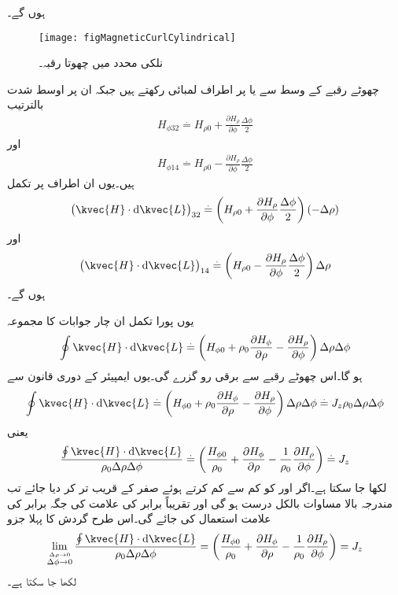 ہوں گے۔
\begin{figure}
\centering
\texttt{[image: figMagneticCurlCylindrical]}
\caption{نلکی محدد میں چھوتا رقبہ۔}
\label{شکل_مقناطیسی_نلکی_شدت_رقبہ}
\end{figure}

چھوٹے رقبے کے وسط سے   یا  پر  اطراف
  لمبائی رکھتے ہیں جبکہ ان پر اوسط شدت بالترتیب
\begin{align*}
H_{\phi 32}\overset{.}{=}H_{\rho 0}+\frac{\partial H_\rho}{\partial \phi}\frac{\Delta \phi}{2}
\end{align*}
اور
\begin{align*}
H_{\phi 14}\overset{.}{=}H_{\rho 0}-\frac{\partial H_\rho}{\partial \phi}\frac{\Delta \phi}{2}
\end{align*}
ہیں۔یوں ان اطراف پر تکمل
\begin{align*}
\left(\kvec{H} \cdot \dif \kvec{L}\right)_{32} \overset{.}{=}\left(H_{\rho 0}+\frac{\partial H_\rho}{\partial \phi}\frac{\Delta \phi}{2} \right)\left(-\Delta \rho \right)
\end{align*}
اور
\begin{align*}
\left(\kvec{H} \cdot \dif \kvec{L}\right)_{14} \overset{.}{=}\left(H_{\rho 0}-\frac{\partial H_\rho}{\partial \phi}\frac{\Delta \phi}{2} \right)\Delta \rho
\end{align*}
ہوں گے۔

یوں پورا تکمل ان چار جوابات کا مجموعہ
\begin{align}\label{مساوات_مقناطیسی_نلکی_پہلا_بند_تکمل}
\oint\kvec{H} \cdot \dif \kvec{L}\overset{.}{=}\left(H_{\phi 0} +\rho_0 \frac{\partial H_\phi}{\partial \rho}-\frac{\partial H_\rho}{\partial \phi}\right)\Delta \rho \Delta \phi
\end{align}
ہو گا۔اس چھوٹے رقبے سے  برقی رو گزرے گی۔یوں ایمپیئر کے دوری قانون سے
\begin{align*}
\oint \kvec{H} \cdot \dif \kvec{L}\overset{.}{=}\left(H_{\phi 0} +\rho_0 \frac{\partial H_\phi}{\partial \rho}-\frac{\partial H_\rho}{\partial \phi}\right)\Delta \rho \Delta \phi\overset{.}{=}J_z \rho_0 \Delta \rho \Delta \phi
\end{align*}
یعنی
\begin{align*}
\frac{\oint \kvec{H} \cdot \dif \kvec{L}}{\rho_0 \Delta \rho \Delta \phi}\overset{.}{=}\left(\frac{H_{\phi 0}}{\rho_0} +\frac{\partial H_\phi}{\partial \rho}-\frac{1}{\rho_0}\frac{\partial H_\rho}{\partial \phi}\right)\overset{.}{=}J_z
\end{align*}
لکھا جا سکتا ہے۔اگر  اور  کو کم سے کم کرتے ہوئے صفر کے قریب تر کر دیا جائے تب مندرجہ بالا مساوات بالکل درست ہو گی اور تقریباً برابر کی علامت  کی جگہ برابر کی علامت  استعمال کی جائے گی۔اس طرح گردش کا پہلا جزو 
\begin{align}\label{مساوات_مقناطیسی_رداسی_زیڈ_گردش}
\lim_{\overset{\Delta \rho \to 0}{\Delta \phi \to 0}}\frac{\oint \kvec{H} \cdot \dif \kvec{L}}{\rho_0 \Delta \rho \Delta \phi}=\left(\frac{H_{\phi 0}}{\rho_0} +\frac{\partial H_\phi}{\partial \rho}-\frac{1}{\rho_0}\frac{\partial H_\rho}{\partial \phi}\right)=J_z
\end{align}
لکھا جا سکتا ہے۔

